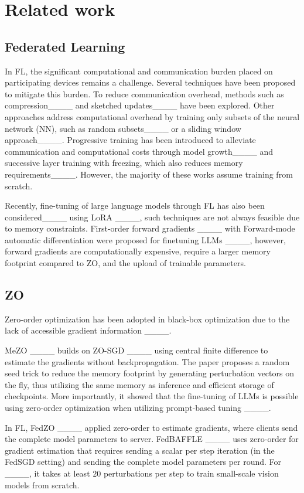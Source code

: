 \section{Related work}
\subsection{Federated Learning}
In FL, the significant computational and communication burden placed on participating devices remains a challenge. Several techniques have been proposed to mitigate this burden. To reduce communication overhead, methods such as compression____ and sketched updates____ have been explored. Other approaches address computational overhead by training only subsets of the neural network (NN), such as random subsets____ or a sliding window approach____. Progressive training has been introduced to alleviate communication and computational costs through model growth____ and successive layer training with freezing, which also reduces memory requirements____. However, the majority of these works assume training from scratch. 

Recently, fine-tuning of large language models through FL has also been considered____ using LoRA ____, such techniques are not always feasible due to memory constraints. First-order forward gradients ____ with Forward-mode automatic differentiation were proposed for finetuning LLMs ____, however, forward gradients are computationally expensive, require a larger memory footprint compared to \ac{ZO}, and the upload of trainable parameters.  



\subsection{\acl{ZO}}

Zero-order optimization has been adopted in black-box optimization due to the lack of accessible gradient information ____.

MeZO ____ builds on ZO-SGD ____ using central finite difference to estimate the gradients without backpropagation. The paper proposes a random seed trick to reduce the memory footprint by generating perturbation vectors on the fly, thus utilizing the same memory as inference and efficient storage of checkpoints. More importantly, it showed that the fine-tuning of LLMs is possible using zero-order optimization when utilizing prompt-based tuning ____.

 In \ac{FL}, FedZO ____ applied zero-order to estimate gradients, where clients send the complete model parameters to server. FedBAFFLE ____ uses zero-order for gradient estimation that requires sending a scalar per step iteration (in the FedSGD setting) and sending the complete model parameters per round. For ____, it takes at least $20$ perturbations per step to train small-scale vision models from scratch. 

